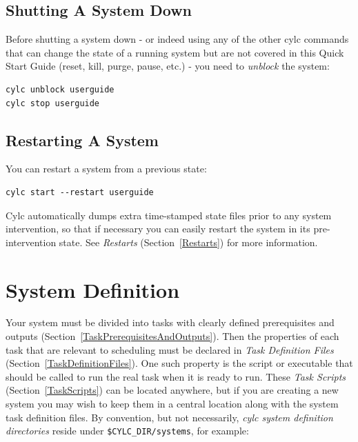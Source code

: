 \documentclass[11pt,a4paper]{article}
\begin{document}
\lstset{language=bash}
\subsection{Shutting A System Down}
\label{QuickShuttingASystemDown}

\lstset{language=bash}

Before shutting a system down - or indeed using any of the other cylc
commands that can change the state of a running system but are not 
covered in this Quick Start Guide (reset, kill, purge, pause, etc.) -
you need to {\em unblock} the system:

\begin{lstlisting}
cylc unblock userguide
cylc stop userguide
\end{lstlisting}

\subsection{Restarting A System}
\label{QuickRestartingASystem}

You can restart a system from a previous state:

\begin{lstlisting}
cylc start --restart userguide
\end{lstlisting}

Cylc automatically dumps extra time-stamped state files prior to any
system intervention, so that if necessary you can easily restart the
system in its pre-intervention state.  See {\em Restarts}
(Section~\ref{Restarts}) for more information.


\pagebreak
\section{System Definition} 
\label{SystemDefinition}


Your system must be divided into tasks with clearly defined
prerequisites and outputs (Section~\ref{TaskPrerequisitesAndOutputs}). Then
the properties of each task that are relevant to scheduling must be
declared in {\em Task Definition Files}
(Section~\ref{TaskDefinitionFiles}). One such property is the script or
executable that should be called to run the real task when
it is ready to run. These {\em Task Scripts} (Section~\ref{TaskScripts})
can be located anywhere, but if you are creating a new system you may
wish to keep them in a central location along with the system task
definition files.  By convention, but not necessarily, {\em cylc system
definition directories} reside under \lstinline=$CYLC_DIR/systems=, for
example:
\end{document}
